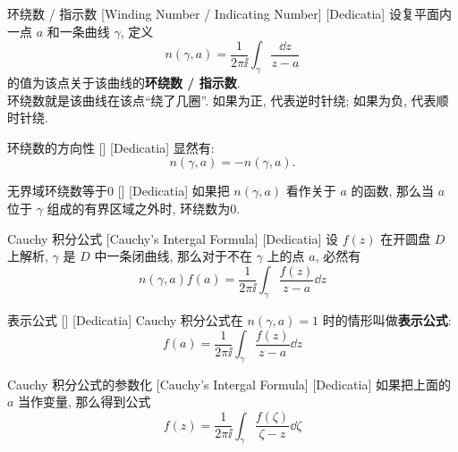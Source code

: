 \documentclass[UTF8]{ctexart}
\begin{document}
        \begin{dfn}
            [WindingNumber]
            {环绕数 / 指示数}
            [Winding Number / Indicating Number]
            [Dedicatia]
            设复平面内一点 \(a\) 和一条曲线 \(\gamma\), 定义
            \[n(\gamma, a)=\frac{1}{2\pi\ii}\int_\gamma\frac{\dd{z}}{z-a}\]
            的值为该点关于该曲线的\textbf{环绕数 / 指示数}.\\
            环绕数就是该曲线在该点“绕了几圈”. 如果为正, 代表逆时针绕; 如果为负, 代表顺时针绕. 
        \end{dfn}

        \begin{ppt}
            [UUID]
            {环绕数的方向性}
            []
            [Dedicatia]
            显然有: 
            \[n(\gamma,a)=-n(\gamma,a).\]
        \end{ppt}

        \begin{ppt}
            [UUID]
            {无界域环绕数等于0}
            []
            [Dedicatia]
            如果把 \(n(\gamma,a)\) 看作关于 \(a\) 的函数, 那么当 \(a\) 位于 \(\gamma\) 组成的有界区域之外时, 环绕数为0.
        \end{ppt}

        \begin{thm}
            [UUID]
            {Cauchy 积分公式}
            [Cauchy's Intergal Formula]
            [Dedicatia]
            设 \(f(z)\) 在开圆盘 \(D\) 上解析,  \(\gamma\) 是 \(D\) 中一条闭曲线, 那么对于不在 \(\gamma\) 上的点 \(a\), 必然有
            \[n(\gamma,a)f(a)=\frac{1}{2\pi\ii}\int_\gamma\frac{f(z)}{z-a}\dd{z} \]
        \end{thm}

        \begin{crl}
            [CauchyRepresenting]
            {表示公式}
            []
            [Dedicatia]
            Cauchy 积分公式在 \(n(\gamma,a)=1\) 时的情形叫做\textbf{表示公式}:
            \[f(a)=\frac{1}{2\pi\ii}\int_\gamma\frac{f(z)}{z-a}\dd{z}\]
        \end{crl}

        \begin{crl}
            [UUID]
            {Cauchy 积分公式的参数化}
            [Cauchy's Intergal Formula]
            [Dedicatia]
            如果把上面的 \(a\) 当作变量, 那么得到公式
            \[f(z)=\frac{1}{2\pi\ii}\int_\gamma\frac{f(\zeta)}{\zeta-z}\dd{\zeta}\]
        \end{crl}
\end{document}
